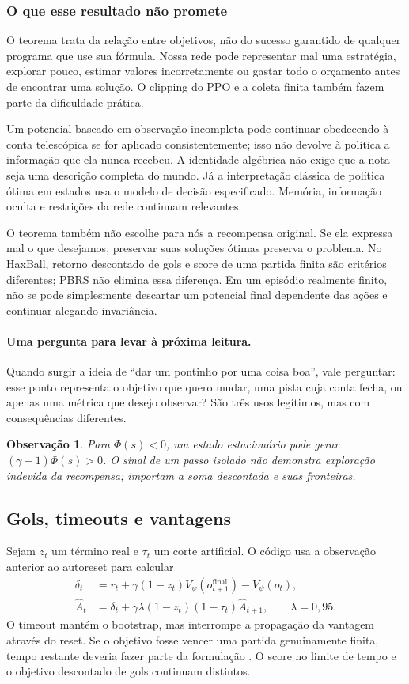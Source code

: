 \documentclass[11pt,a4paper]{article}
\newtheorem{observacao}{Observação}
\begin{document}
\subsubsection*{O que esse resultado não promete}
O teorema trata da relação entre objetivos, não do sucesso garantido de qualquer programa que use sua fórmula. Nossa rede pode representar mal uma estratégia, explorar pouco, estimar valores incorretamente ou gastar todo o orçamento antes de encontrar uma solução. O clipping do PPO e a coleta finita também fazem parte da dificuldade prática.

Um potencial baseado em observação incompleta pode continuar obedecendo à conta telescópica se for aplicado consistentemente; isso não devolve à política a informação que ela nunca recebeu. A identidade algébrica não exige que a nota seja uma descrição completa do mundo. Já a interpretação clássica de política ótima em estados usa o modelo de decisão especificado. Memória, informação oculta e restrições da rede continuam relevantes.

O teorema também não escolhe para nós a recompensa original. Se ela expressa mal o que desejamos, preservar suas soluções ótimas preserva o problema. No HaxBall, retorno descontado de gols e score de uma partida finita são critérios diferentes; PBRS não elimina essa diferença. Em um episódio realmente finito, não se pode simplesmente descartar um potencial final dependente das ações e continuar alegando invariância.

\paragraph{Uma pergunta para levar à próxima leitura.}
Quando surgir a ideia de ``dar um pontinho por uma coisa boa'', vale perguntar: esse ponto representa o objetivo que quero mudar, uma pista cuja conta fecha, ou apenas uma métrica que desejo observar? São três usos legítimos, mas com consequências diferentes.

\begin{observacao}
Para $\Phi(s)<0$, um estado estacionário pode gerar $(\gamma-1)\Phi(s)>0$. O sinal de um passo isolado não demonstra exploração indevida da recompensa; importam a soma descontada e suas fronteiras.
\end{observacao}

\subsection{Gols, timeouts e vantagens}
Sejam $z_t$ um término real e $\tau_t$ um corte artificial. O código usa a observação anterior ao autoreset para calcular
\begin{align}
 \delta_t&=r_t+\gamma(1-z_t)V_\psi(o_{t+1}^{\mathrm{final}})-V_\psi(o_t),\\
 \widehat A_t&=\delta_t+\gamma\lambda(1-z_t)(1-\tau_t)\widehat A_{t+1},
 \qquad\lambda=0{,}95.
 \label{eq:gae}
\end{align}
O timeout mantém o bootstrap, mas interrompe a propagação da vantagem através do reset. Se o objetivo fosse vencer uma partida genuinamente finita, tempo restante deveria fazer parte da formulação \cite{pardo2018}. O score no limite de tempo e o objetivo descontado de gols continuam distintos.
\end{document}
